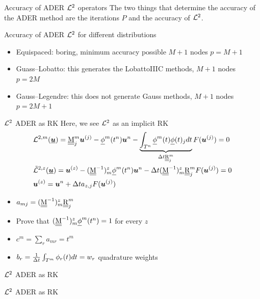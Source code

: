 \documentclass[9pt,compress,t,aspectratio=169]{beamer}
\begin{document}
\begin{frame}{Accuracy of ADER $\mathcal{L}^2$ operators}
	The two things that determine the accuracy of the ADER method are the iterations $P$ and the accuracy of $\mathcal{L}^2$.

	\begin{block}{Accuracy of ADER $\mathcal{L}^2$ for different distributions}
		\begin{itemize}
			\item Equispaced: boring, minimum accuracy possible $M+1$ nodes $p=M+1$
			\item Guass--Lobatto: this generates the LobattoIIIC methods, $M+1$ nodes $p=2M$
			\item Gauss--Legendre: this does not generate Gauss methods, $M+1$ nodes $p=2M+1$ 
		\end{itemize}
		
	\end{block}

\end{frame}
\begin{frame}{$\mathcal{L}^2$ ADER as RK}
	Here, we see $\mathcal{L}^2$ as an implicit RK
	\begin{align*}
		&\mathcal{L}^{2,m}(\underline{\boldsymbol{u}}) = \underline{\underline{\mathrm{M}}}^m_j \boldsymbol{u}^{(j)} - \underline{\phi}^m(t^{n}) \boldsymbol{u}^n - \underbrace{\int_{T^n} \underline{\phi}^m(t) 
		 \underline{\phi}(t)_j dt}_{\Delta t \underline{\underline{\mathrm{R}}}_j^m}  F(\boldsymbol{u}^{(j)})=0\\
		&\tilde{\mathcal{L}}^{2,z}(\underline{\boldsymbol{u}}) =  \boldsymbol{u}^{(z)} - (\underline{\underline{\mathrm{M}}}^{-1})_m^z \underline{\phi}^m(t^{n})
		 \boldsymbol{u}^n - \Delta t (\underline{\underline{\mathrm{M}}}^{-1})_m^z\underline{\underline{\mathrm{R}}}_j^m F(\boldsymbol{u}^{(j)}) =0 \\
		 &\boldsymbol{u}^{(z)} = 
		 \boldsymbol{u}^n + \Delta t a_{z,j} F(\boldsymbol{u}^{(j)})   
	\end{align*}
	\begin{itemize}
		\item $a_{mj} = (\underline{\underline{\mathrm{M}}}^{-1})_m^z\underline{\underline{\mathrm{R}}}_j^m$
		\item Prove that  $(\underline{\underline{\mathrm{M}}}^{-1})_m^z \underline{\phi}^m(t^{n})= 1$ for every $z$
		\item $c^m= \sum_r a_{mr} = t^m$
		\item $b_r = \frac{1}{\Delta t}\int_{T^m} \phi_r(t)dt =w_r$ quadrature weights
	\end{itemize}
\end{frame}
\begin{frame}{$\mathcal{L}^2$ ADER as RK}
	
\end{frame}
\begin{frame}{$\mathcal{L}^2$ ADER as RK}
	
\end{frame}
\end{document}
